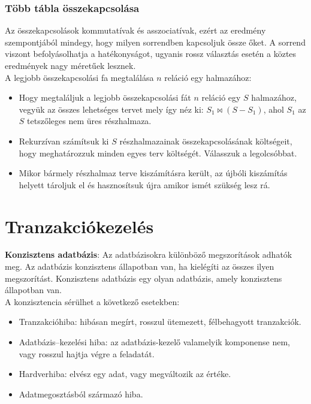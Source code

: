 \documentclass[12pt,margin=0px]{article}
\begin{document}
	\subsubsection*{Több tábla összekapcsolása}

    Az összekapcsolások kommutatívak és asszociatívak, ezért az eredmény szempontjából mindegy, hogy milyen sorrendben kapcsoljuk össze őket. A sorrend viszont befolyásolhatja a hatékonyságot, ugyanis rossz választás esetén a köztes eredmények nagy méretűek lesznek.\\
	
	\noindent A legjobb összekapcsolási fa megtalálása $n$ reláció egy halmazához:
	\begin{itemize}
		\item	Hogy megtaláljuk a legjobb összekapcsolási fát $n$ reláció egy $S$ halmazához,
		vegyük az összes lehetséges tervet mely így néz ki: $S_{1} \Join (S - S_{1})$, ahol $S_{1}$ az $S$ tetszőleges nem üres részhalmaza.
		
		\item	Rekurzívan számítsuk ki $S$ részhalmazainak összekapcsolásának költségeit, hogy meghatározzuk minden egyes terv költségét. Válasszuk a legolcsóbbat.
		
		\item	Mikor bármely részhalmaz terve kiszámításra került, az újbóli kiszámítás helyett tároljuk el és hasznosítsuk újra amikor ismét szükség lesz rá.
	\end{itemize}
	
	\section*{Tranzakciókezelés}
	
	\noindent \textbf{Konzisztens adatbázis}: Az adatbázisokra különböző megszorítások adhatók meg. Az adatbázis konzisztens állapotban
	van, ha kielégíti az összes ilyen megszorítást. Konzisztens adatbázis egy olyan adatbázis, amely konzisztens állapotban van.\\
	
	\noindent A konzisztencia sérülhet a következő esetekben:
	\begin{itemize}
		\item	Tranzakcióhiba: hibásan megírt, rosszul ütemezett, félbehagyott tranzakciók.
		\item	Adatbázis--kezelési hiba: az adatbázis-kezelő valamelyik komponense nem, vagy rosszul hajtja végre a feladatát.
		\item	Hardverhiba: elvész egy adat, vagy megváltozik az értéke.
		\item	Adatmegosztásból származó hiba.
	\end{itemize}
	
\end{document}
